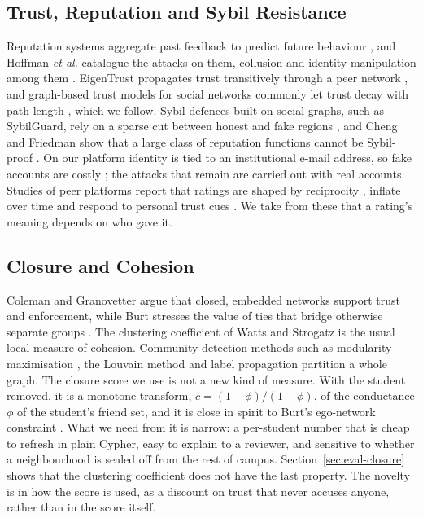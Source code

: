 \documentclass[journal]{IEEEtran}
\begin{document}
\subsection{Trust, Reputation and Sybil Resistance}
Reputation systems aggregate past feedback to predict future behaviour
\cite{resnick2000reputation,dellarocas2003digitization,josang2007survey}, and
Hoffman \emph{et al.} catalogue the attacks on them, collusion and identity
manipulation among them \cite{hoffman2009survey}. EigenTrust propagates trust
transitively through a peer network \cite{kamvar2003eigentrust}, and graph-based
trust models for social networks commonly let trust decay with path length
\cite{jiang2016trust}, which we follow. Sybil defences built on social graphs, such
as SybilGuard, rely on a sparse cut between honest and fake regions
\cite{yu2008sybilguard}, and Cheng and Friedman show that a large class of
reputation functions cannot be Sybil-proof \cite{cheng2005sybilproof}. On our
platform identity is tied to an institutional e-mail address, so fake accounts are
costly \cite{douceur2002sybil}; the attacks that remain are carried out with real
accounts. Studies of peer platforms report that ratings are shaped by reciprocity
\cite{bolton2013engineering}, inflate over time \cite{filippas2022reputation} and
respond to personal trust cues \cite{ert2016trust}. We take from these that a
rating's meaning depends on who gave it.

\subsection{Closure and Cohesion}
Coleman \cite{coleman1988social} and Granovetter \cite{granovetter1985economic}
argue that closed, embedded networks support trust and enforcement, while Burt
stresses the value of ties that bridge otherwise separate groups
\cite{burt1992structural}. The clustering coefficient of Watts and Strogatz
\cite{watts1998collective} is the usual local measure of cohesion. Community
detection methods such as modularity maximisation \cite{newman2006modularity}, the
Louvain method \cite{blondel2008fast} and label propagation \cite{raghavan2007lpa}
partition a whole graph. The closure score we use is not a new kind of measure. With
the student removed, it is a monotone transform, $c=(1-\phi)/(1+\phi)$, of the
conductance $\phi$ \cite{kannan2004clusterings} of the student's friend set, and it is
close in spirit to Burt's ego-network constraint \cite{burt1992structural}. What we need from it is narrow: a per-student
number that is cheap to refresh in plain Cypher, easy to explain to a reviewer, and
sensitive to whether a neighbourhood is sealed off from the rest of campus.
Section~\ref{sec:eval-closure} shows that the clustering coefficient does not have
the last property. The novelty is in how the score is used, as a discount on trust
that never accuses anyone, rather than in the score itself.
\end{document}
